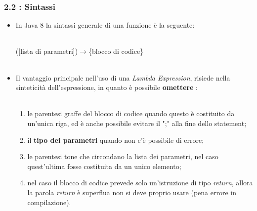 \documentclass{beamer}
\begin{document}

\begin{frame}
	\frametitle{\textbf{2.2 : Sintassi}}
	\begin{itemize}
		\item
			In Java 8 la sintassi generale di una funzione è la seguente:\\\
			\begin{center}
				\Large ([lista di parametri])$\rightarrow$\{blocco di codice\}\\\
			\end{center}
		\item 
			Il vantaggio principale nell'uso di una \textit{Lambda Expression}, risiede nella sinteticità dell'espressione, in quanto è possibile \textbf{omettere} :\\\
			\begin{enumerate}
				\item
					le parentesi graffe del blocco di codice quando questo è costituito da un'unica riga, ed è anche possibile evitare il ";" alla fine dello statement;\\
				\item
					il \textbf{tipo dei parametri} quando non c'è possibile di errore;\\
				\item
					le parentesi tone che circondano la lista dei parametri, nel caso quest'ultima fosse costituita da un unico elemento;\\
				\item
					nel caso il blocco di codice prevede solo un'istruzione di tipo \textit{return}, allora la parola \textit{return} è superflua non si deve proprio usare (pena errore in compilazione).					
			\end{enumerate}
	\end{itemize}	
\end{frame}

\end{document}
